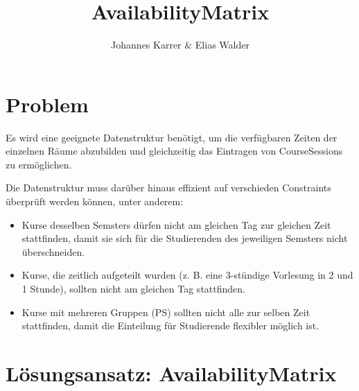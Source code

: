 \documentclass{article}
\title{AvailabilityMatrix}
\author{Johannes Karrer \& Elias Walder}
\begin{document}
	\maketitle
	\section{Problem}
	Es wird eine geeignete Datenstruktur benötigt, um die verfügbaren Zeiten der einzelnen Räume abzubilden und gleichzeitig das Eintragen von CourseSessions zu ermöglichen.
	
	Die Datenstruktur muss darüber hinaus effizient auf verschieden Constraints überprüft werden können, unter anderem:
	
	\begin{itemize}
		\item Kurse desselben Semsters dürfen nicht am gleichen Tag zur gleichen Zeit stattfinden, damit sie sich für die Studierenden des jeweiligen Semsters nicht überschneiden.
		\item Kurse, die zeitlich aufgeteilt wurden (z. B. eine 3-stündige Vorlesung in 2 und 1 Stunde), sollten nicht am gleichen Tag stattfinden.
		\item Kurse mit mehreren Gruppen (PS) sollten nicht alle zur selben Zeit stattfinden, damit die Einteilung für Studierende flexibler möglich ist.
	\end{itemize}
	
	\section{Lösungsansatz: AvailabilityMatrix}
	
\end{document}
